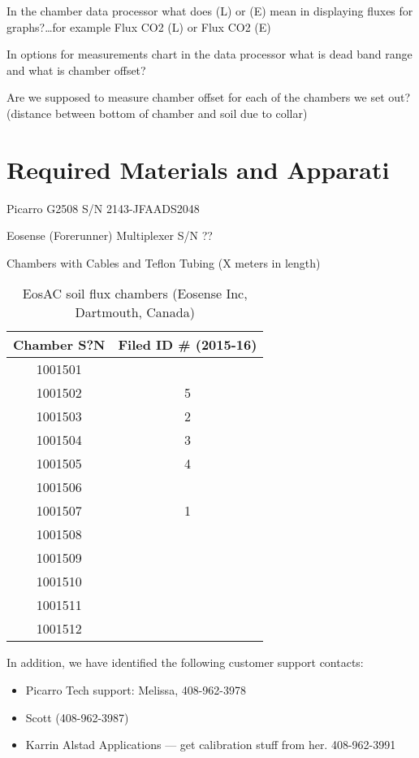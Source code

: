 \documentclass[12pt]{../SOP3}\usepackage[]{graphicx}\usepackage[]{color}
\begin{document}
\NP In the chamber data processor what does (L) or (E) mean in displaying fluxes for graphs?\ldots for example Flux CO2 (L) or Flux CO2 (E) 

\NP In options for measurements chart in the data processor what is dead band range and what is chamber offset? 

\NP Are we supposed to measure chamber offset for each of the chambers we set out? (distance between bottom of chamber and soil due to collar)


\section{Required Materials and Apparati}

\NP Picarro G2508 S/N 2143-JFAADS2048

\NP Eosense (Forerunner) Multiplexer S/N ??

\NP Chambers with Cables and Teflon Tubing (X meters in length)

\begin{table}
\caption{EosAC soil flux chambers (Eosense Inc, Dartmouth, Canada)}
\begin{tabular}{cc} \hline
Chamber S?N   & Filed ID \# (2015-16)  \\ \hline\hline
1001501       &         \\
1001502       &  5       \\
1001503       &  2       \\
1001504       &   3      \\
1001505       &   4      \\
1001506       &         \\
1001507       &  1       \\
1001508       &         \\
1001509       &         \\
1001510       &         \\
1001511       &         \\
1001512       &         \\ \hline
\end{tabular}
\end{table}


\NP In addition, we have identified the following customer support contacts:

\begin{itemize}
  \item Picarro Tech support: Melissa, 408-962-3978
  \item Scott (408-962-3987)
  \item Karrin Alstad Applications --- get calibration stuff from her. 408-962-3991
\end{itemize}
\end{document}
